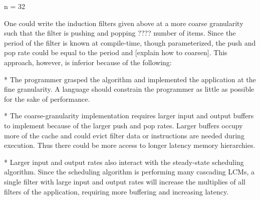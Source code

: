n = 32

One could write the induction filters given above at a more coarse granularity
such that the filter is pushing and popping ???? number of items.
Since the period of the filter is known at compile-time, though
parameterized, the push and pop rate could be equal to the period and
[explain how to coarsen].  This approach, however, is inferior because
of the following:

* The programmer grasped the algorithm and implemented the application
at the fine granularity.  A language should constrain the programmer
as little as possible for the sake of performance.

* The coarse-granularity implementation requires larger input and
output buffers to implement because of the larger push and pop rates.
Larger buffers occupy more of the cache and could evict filter data or
instructions are needed during execution.  Thus there could be more
access to longer latency memory hierarchies.

* Larger input and output rates also interact with the steady-state
scheduling algorithm.  Since the scheduling algorithm is performing
many cascading LCMs, a single filter with large input and output rates
will increase the multiplies of all filters of the application,
requiring more buffering and increasing latency.